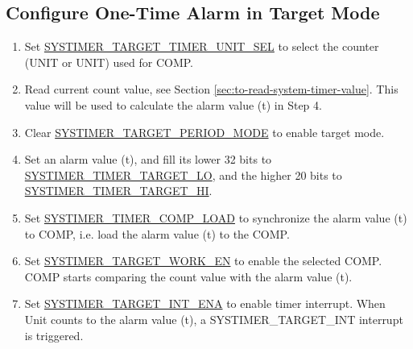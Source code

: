 \documentclass[main\_\_EN.tex]{subfiles}
\begin{document}
\subsection{Configure One-Time Alarm in Target Mode}
\begin{enumerate}
    \item Set \hyperref[fielddesc:SYSTIMERTARGET0TIMERUNITSEL]{SYSTIMER\_TARGET\_TIMER\_UNIT\_SEL} to select the counter (UNIT or UNIT) used for COMP.
    \item Read current count value, see Section \ref{sec:to-read-system-timer-value}. This value will be used to calculate the alarm value (t) in Step 4.
    \item Clear \hyperref[fielddesc:SYSTIMERTARGET0PERIODMODE]{SYSTIMER\_TARGET\_PERIOD\_MODE} to enable target mode.
    \item Set an alarm value (t), and fill its lower 32 bits to \hyperref[fielddesc:SYSTIMERTIMERTARGET0LO]{SYSTIMER\_TIMER\_TARGET\_LO}, and the higher 20 bits to \hyperref[fielddesc:SYSTIMERTIMERTARGET0HI]{SYSTIMER\_TIMER\_TARGET\_HI}.
    \item Set \hyperref[fielddesc:SYSTIMERTIMERCOMP0LOAD]{SYSTIMER\_TIMER\_COMP\_LOAD} to synchronize the alarm value (t) to COMP, i.e. load the alarm value (t) to the COMP.
    \item Set \hyperref[fielddesc:SYSTIMERTARGET0WORKEN]{SYSTIMER\_TARGET\_WORK\_EN} to enable the selected COMP. COMP starts comparing the count value with the alarm value (t).
    \item Set \hyperref[fielddesc:SYSTIMERTARGET0INTENA]{SYSTIMER\_TARGET\_INT\_ENA} to enable timer interrupt. When Unit counts to the alarm value (t), a SYSTIMER\_TARGET\_INT interrupt is triggered.
\end{enumerate}
\end{document}
